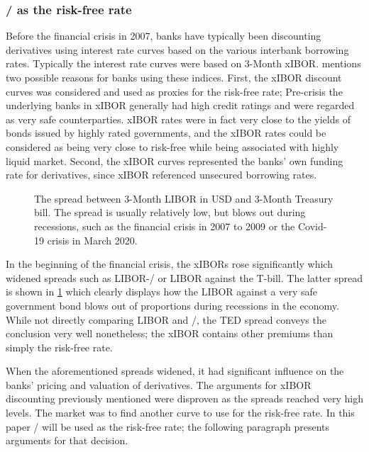 \documentclass[main.tex]{subfiles}
\begin{document}
    \subsubsection{\OIS/ as the risk-free rate}
    
    Before the financial crisis in 2007, banks have typically been discounting
    derivatives using interest rate curves based on the various interbank borrowing rates.
    Typically the interest rate curves were based on 3-Month xIBOR.
    \textcite[Section 8.6]{Green2015XVA} 
    mentions two possible reasons for banks using these indices.
    First, the xIBOR discount curves was considered and used as proxies for the risk-free rate;
    Pre-crisis the underlying banks in xIBOR generally had high credit ratings
    and were regarded as very safe counterparties.
    xIBOR rates were in fact very close to the yields of bonds issued by highly rated governments,
    and the xIBOR rates could be considered as being very close to risk-free 
    while being associated with highly liquid market.
    Second, the xIBOR curves represented the banks' own funding rate for derivatives, since
    xIBOR referenced unsecured borrowing rates.

    \begin{figure}
        \centering
        \resizebox{\textwidth}{!}{%
            
        }
        \caption{
            The spread between 3-Month LIBOR in USD and 3-Month Treasury bill.
            The spread is usually relatively low, 
            but blows out during recessions, 
            such as the financial crisis in 2007 to 2009 or
            the Covid-19 crisis in March 2020.
        }
        \label{fig:ted-spread}
    \end{figure}

    In the beginning of the financial crisis, the xIBORs rose significantly
    which widened spreads such as LIBOR-\OIS/ or LIBOR against the T-bill.
    The latter spread is shown in \cref{fig:ted-spread} which clearly 
    displays how the LIBOR against a very safe government bond blows out of proportions
    during recessions in the economy. 
    While not directly comparing LIBOR and \OIS/, 
    the TED spread conveys the conclusion very well nonetheless;
    the xIBOR contains other premiums than simply the risk-free rate.

    When the aforementioned spreads widened, 
    it had significant influence on the banks' pricing and valuation of derivatives.
    The arguments for xIBOR discounting previously mentioned
    were disproven as the spreads reached very high levels.
    The market was to find another curve to use for the risk-free rate.
    In this paper \OIS/ will be used as the risk-free rate;
    the following paragraph presents arguments for that decision.
\end{document}
